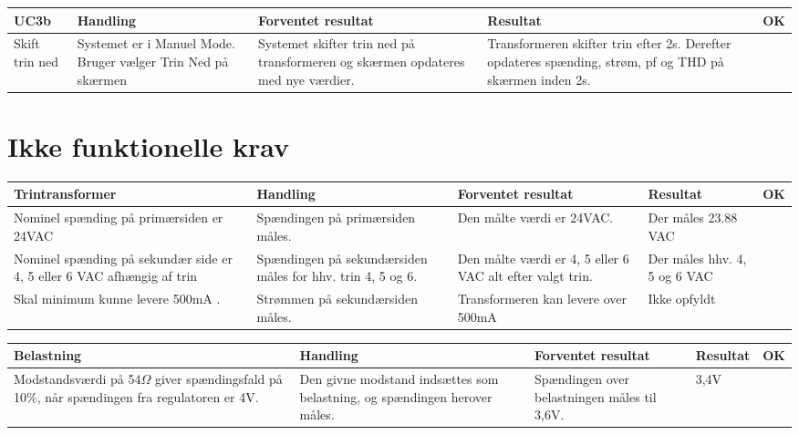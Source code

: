 \begin{table}[H]
	\centering
	\begin{tabular}{|p{2cm}|p{3cm}|p{4cm}|p{4.5cm}|p{1cm}|}
		\hline
		\textbf{UC3b} & \textbf{Handling} & \textbf{Forventet resultat} & \textbf{Resultat} &\textbf{OK} \\\hline
		Skift trin ned & Systemet er i Manuel Mode. Bruger vælger Trin Ned på skærmen & Systemet skifter trin ned på transformeren og skærmen opdateres med nye værdier. & Transformeren skifter trin efter 2s. Derefter opdateres spænding, strøm, pf og THD på skærmen inden 2s.  & \checkmark \\\hline
		
		
	\end{tabular}
	
	
\end{table}

\section{Ikke funktionelle krav}
\begin{table}[H]
	\centering
	\begin{tabular}{|p{4cm}|p{3cm}|p{3cm}|p{3cm}|p{1cm}|}
		\hline
		\textbf{Trintransformer} & \textbf{Handling} & \textbf{Forventet resultat} & \textbf{Resultat} &\textbf{OK} \\\hline
		Nominel spænding på primærsiden er 24VAC & Spændingen på primærsiden måles. & Den målte værdi er 24VAC. & Der måles 23.88 VAC & \checkmark \\\hline
		Nominel spænding på sekundær side er 4, 5 eller 6 VAC afhængig af trin & Spændingen på sekundærsiden måles for hhv. trin 4, 5 og 6. & Den målte værdi er 4, 5 eller 6 VAC alt efter valgt trin. & Der måles hhv. 4, 5 og 6 VAC & \checkmark \\\hline
		Skal minimum kunne levere 500mA	. & Strømmen på sekundærsiden måles. & Transformeren kan levere over 500mA & Ikke opfyldt  & \\\hline
	\end{tabular}
	
\end{table}

\begin{table}[H]
	\centering
	\begin{tabular}{|p{4cm}|p{3cm}|p{3cm}|p{3cm}|p{1cm}|}
		\hline
		\textbf{Belastning} & \textbf{Handling} & \textbf{Forventet resultat} & \textbf{Resultat} &\textbf{OK} \\\hline
		Modstandsværdi på 54$\Omega$ giver spændingsfald på 10\%, når spændingen fra regulatoren er 4V. & Den givne modstand indsættes som belastning, og spændingen herover måles. & Spændingen over belastningen måles til 3,6V. & 3,4V & \checkmark \\\hline	
	\end{tabular}
	
	
\end{table}

